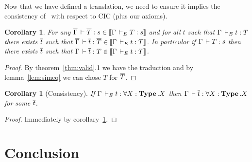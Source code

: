 \documentclass[11pt]{article}
\theoremstyle{plain}
\newtheorem{corollary}[theorem]{Corollary}
\theoremstyle{remark}
\begin{document}
Now that we have defined a translation, we need to ensure it implies the
consistency of \CCe\ with respect to CIC (plus our axioms).

\begin{corollary}
  \label{cor:choice}
  For any $\overline{\Gamma} \,\vdash \overline{T} : s \in \mathopen{{[\kern-0.14em[}} \Gamma \,\vdash_E T : s \mathclose{{]\kern-0.14em]}}$ and for all
  $t$ such that $\Gamma \,\vdash_E t : T$ there exists $\overline{t}$ such that
  $\overline{\Gamma} \,\vdash \overline{t} : \overline{T} \in \mathopen{{[\kern-0.14em[}} \Gamma \,\vdash_E t : T \mathclose{{]\kern-0.14em]}}$.
  In particular if $\Gamma \,\vdash T : s$ then there exists $\overline{t}$ such that
  $\Gamma \,\vdash \overline{t} : T \in \mathopen{{[\kern-0.14em[}} \Gamma \,\vdash_E t : T \mathclose{{]\kern-0.14em]}}$.
\end{corollary}

\begin{proof}
  By theorem~\ref{thm:valid}.1 we have the traduction and by
  lemma~\ref{lem:simeq} we can chose $T$ for $\overline{T}$.
\end{proof}

\begin{corollary}[Consistency]
  If $\Gamma \,\vdash_E t : \forall X:\operatorname{\mathbf{Type}}.X$
  then $\Gamma \,\vdash \overline{t} : \forall X:\operatorname{\mathbf{Type}}.X$ for some $\overline{t}$.
\end{corollary}

\begin{proof}
  Immediately by corollary~\ref{cor:choice}.
\end{proof}

\section*{Conclusion}




\end{document}
